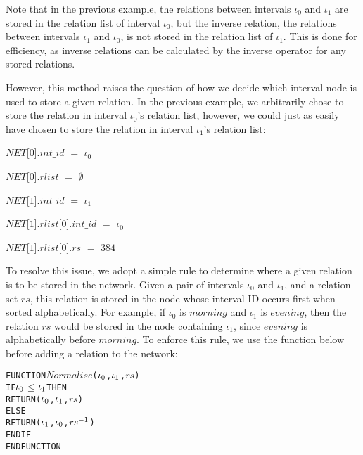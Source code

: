\documentclass[11pt]{report}
\newenvironment{vverbatim}
{
  \begin{alltt}
}
{
  \vspace{-\baselineskip}
  \end{alltt}
}
\newenvironment{vquote}
{
  \begin{list}{}{\leftmargin 1em}\item[]
}
{
  \end{list}
}
\begin{document}
          Note that in the previous example, the relations between intervals
          $\iota_0$ and $\iota_1$ are stored in the relation list of interval
          $\iota_0$, but the inverse relation, the relations between intervals
          $\iota_1$ and $\iota_0$, is not stored in the relation list of
          $\iota_1$. This is done for efficiency, as inverse relations can be
          calculated by the inverse operator for any stored relations.

          However, this method raises the question of how we decide which
          interval node is used to store a given relation. In the previous
          example, we arbitrarily chose to store the relation in interval
          $\iota_0$'s relation list, however, we could just as easily have
          chosen to store the relation in interval $\iota_1$'s relation list:

          \begin{vquote}
            $NET$[$0$].$int\_id$ $=$ $\iota_0$

            $NET$[$0$].$rlist$ $=$ $\emptyset$

            $NET$[$1$].$int\_id$ $=$ $\iota_1$

            $NET$[$1$].$rlist$[$0$].$int\_id$ $=$ $\iota_0$

            $NET$[$1$].$rlist$[$0$].$rs$ $=$ $384$
          \end{vquote}

          To resolve this issue, we adopt a simple rule to determine where a
          given relation is to be stored in the network. Given a pair of
          intervals $\iota_0$ and $\iota_1$, and a relation set $rs$, this
          relation is stored in the node whose interval ID occurs first when
          sorted alphabetically. For example, if $\iota_0$ is $morning$ and
          $\iota_1$ is $evening$, then the relation $rs$ would be stored
          in the node containing $\iota_1$, since $evening$ is alphabetically
          before $morning$. To enforce this rule, we use the function below
          before adding a relation to the network:

          \begin{vverbatim}
  FUNCTION \(Normalise\)(\(\iota\sb{0}\), \(\iota\sb{1}\), \(rs\))
    IF \(\iota\sb{0}\) \(\leq\) \(\iota\sb{1}\) THEN
      RETURN (\(\iota\sb{0}\), \(\iota\sb{1}\), \(rs\)) 
    ELSE
      RETURN (\(\iota\sb{1}\), \(\iota\sb{0}\), \(rs\sp{-1}\)) 
    ENDIF
  ENDFUNCTION
          \end{vverbatim}
\end{document}
